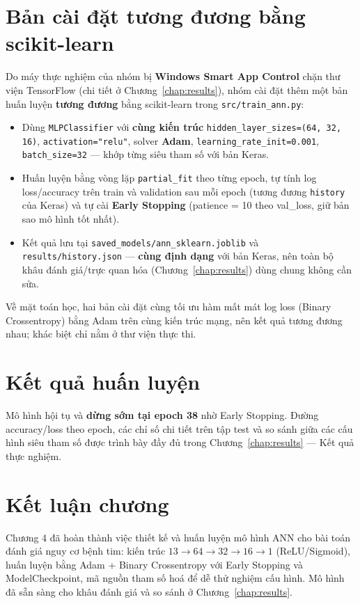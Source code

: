 \section{Bản cài đặt tương đương bằng scikit-learn}
Do máy thực nghiệm của nhóm bị \textbf{Windows Smart App Control} chặn thư viện
TensorFlow (chi tiết ở Chương~\ref{chap:results}), nhóm cài đặt thêm một bản
huấn luyện \textbf{tương đương} bằng scikit-learn trong
\texttt{src/train\_ann.py}:
\begin{itemize}
  \item Dùng \texttt{MLPClassifier} với \textbf{cùng kiến trúc}
        \texttt{hidden\_layer\_sizes=(64, 32, 16)}, \texttt{activation="relu"},
        solver \textbf{Adam}, \texttt{learning\_rate\_init=0.001},
        \texttt{batch\_size=32} --- khớp từng siêu tham số với bản Keras.
  \item Huấn luyện bằng vòng lặp \texttt{partial\_fit} theo từng epoch, tự tính
        log loss/accuracy trên train và validation sau mỗi epoch (tương đương
        \texttt{history} của Keras) và tự cài \textbf{Early Stopping}
        (patience = 10 theo val\_loss, giữ bản sao mô hình tốt nhất).
  \item Kết quả lưu tại \texttt{saved\_models/ann\_sklearn.joblib} và
        \texttt{results/history.json} --- \textbf{cùng định dạng} với bản
        Keras, nên toàn bộ khâu đánh giá/trực quan hóa
        (Chương~\ref{chap:results}) dùng chung không cần sửa.
\end{itemize}
Về mặt toán học, hai bản cài đặt cùng tối ưu hàm mất mát log loss (Binary
Crossentropy) bằng Adam trên cùng kiến trúc mạng, nên kết quả tương đương nhau;
khác biệt chỉ nằm ở thư viện thực thi.

\section{Kết quả huấn luyện}
Mô hình hội tụ và \textbf{dừng sớm tại epoch 38} nhờ Early Stopping. Đường
accuracy/loss theo epoch, các chỉ số chi tiết trên tập test và so sánh giữa các
cấu hình siêu tham số được trình bày đầy đủ trong
Chương~\ref{chap:results} --- Kết quả thực nghiệm.

\section{Kết luận chương}
Chương 4 đã hoàn thành việc thiết kế và huấn luyện mô hình ANN cho bài toán
đánh giá nguy cơ bệnh tim: kiến trúc $13 \to 64 \to 32 \to 16 \to 1$
(ReLU/Sigmoid), huấn luyện bằng Adam + Binary Crossentropy với Early Stopping
và ModelCheckpoint, mã nguồn tham số hoá để dễ thử nghiệm cấu hình. Mô hình đã
sẵn sàng cho khâu đánh giá và so sánh ở Chương~\ref{chap:results}.
